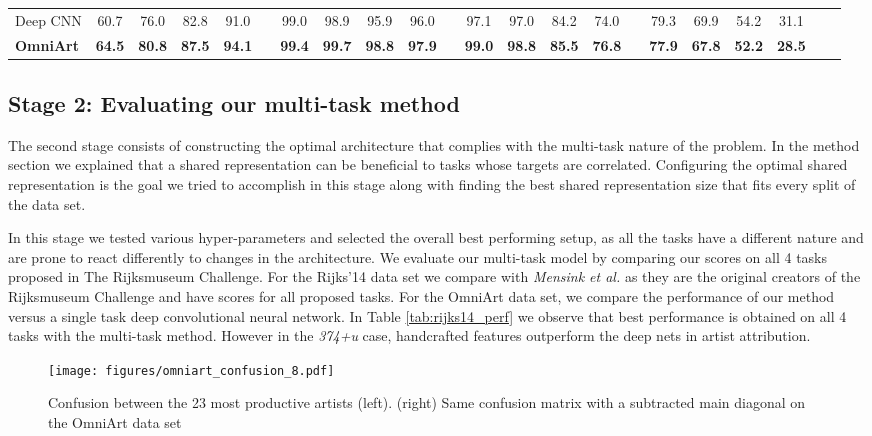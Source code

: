 \documentclass[sigconf]{acmart}
\begin{document}
\begin{table*}[]
\begin{tabular}{lccccccccccccccccccccc}
Deep CNN     & 60.7  & 76.0  & 82.8  & 91.0               && 99.0 & 98.9 & 95.9  & 96.0             && 97.1   & 97.0   & 84.2    & 74.0          && 79.3  & 69.9   & 54.2   & 31.1    \\
\textbf{OmniArt}      & \textbf{64.5 } & \textbf{80.8}  &\textbf{ 87.5}  & \textbf{94.1}               && \textbf{99.4} & \textbf{99.7} & \textbf{98.8 } & \textbf{97.9}             && \textbf{99.0}   & \textbf{98.8}   & \textbf{85.5}    & \textbf{76.8}          && \textbf{77.9}  & \textbf{67.8}   & \textbf{52.2}   & \textbf{28.5}    \\\bottomrule
\end{tabular}
\end{table*}\subsection{Stage 2: Evaluating our multi-task method}

The second stage consists of constructing the optimal architecture that complies with the multi-task nature of the problem. In the method section we explained that a shared representation can be beneficial to tasks whose targets are correlated. Configuring the optimal shared representation is the goal we tried to accomplish in this stage along with finding the best shared representation size that fits every split of the data set.

In this stage we tested various hyper-parameters and selected the overall best performing setup, as all the tasks have a different nature and are prone to react differently to changes in the architecture. We evaluate our multi-task model by comparing our scores on all 4 tasks proposed in The Rijksmuseum Challenge. For the Rijks'14 data set we compare with \textit{Mensink et al.}\cite{mensink2014rijksmuseum} as they are the original creators of the Rijksmuseum Challenge and have scores for all proposed tasks. For the OmniArt data set, we compare the performance of our method versus a single task deep convolutional neural network. In Table \ref{tab:rijks14_perf} we observe that best performance is obtained on all 4 tasks with the multi-task method. However in the \textit{374+u} case, handcrafted features outperform the deep nets in artist attribution. 

\begin{figure}

  \texttt{[image: figures/omniart\_confusion\_8.pdf]}
  \caption{Confusion between the 23 most productive artists (left). (right) Same confusion matrix with a subtracted main diagonal on the OmniArt data set \label{fig:omniconf}}
\end{figure}
\end{document}
